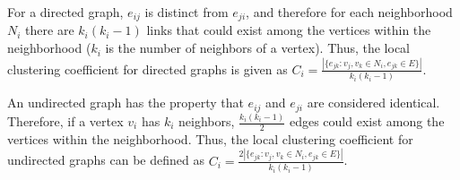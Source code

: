 For a directed graph, $e_{ij}$ is distinct from $e_{ji}$, and therefore for each neighborhood $N_{i}$ there are $k_{i}(k_{i}-1)$ links that could exist among the vertices within the neighborhood ($k_{i}$ is the number of neighbors of a vertex). Thus, the local clustering coefficient for directed graphs is given as $C_{i}={\frac {|\{e_{jk}:v_{j},v_{k}\in N_{i},e_{{jk}}\in E\}|}{k_{i}(k_{i}-1)}}$. 

An undirected graph has the property that $e_{ij}$ and $e_{ji}$ are considered identical. Therefore, if a vertex $v_{i}$ has $k_{i}$ neighbors, $\frac {k_{i}(k_{i}-1)}{2}$   edges could exist among the vertices within the neighborhood. Thus, the local clustering coefficient for undirected graphs can be defined as $C_{i}=\frac {2|\{e_{{jk}}:v_{j},v_{k}\in N_{i},e_{{jk}}\in E\}|}{k_{i}(k_{i}-1)}$.   





